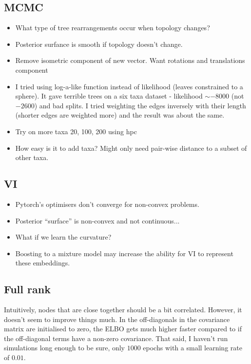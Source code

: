 \documentclass[11pt, twocolumn]{article}
\begin{document}
\subsection{MCMC}
\begin{itemize}
\item What type of tree rearrangements occur when topology changes?
\item Posterior surfance is smooth if topology doesn't change.
\item Remove isometric component of new vector. Want rotations and translations component
\item I tried using log-a-like function instead of likelihood \cite{wilson2021learning} (leaves constrained to a sphere). It gave terrible trees on a six taxa dataset - likelihood $\sim -8000$ (not $-2600$) and bad splits. I tried weighting the edges inversely with their length (shorter edges are weighted more) and the result was about the same.
\item Try on more taxa 20, 100, 200 using hpc
\item How easy is it to add taxa? Might only need pair-wise distance to a subset of other taxa.
\end{itemize}

\subsection{VI}
\begin{itemize}
\item Pytorch's optimisers don't converge for non-convex problems.
\item Posterior ``surface'' is non-convex and not continuous...
\item What if we learn the curvature?
\item Boosting to a mixture model may increase the ability for VI to represent these embeddings.
\end{itemize}

\subsection{Full rank}
Intuitively, nodes that are close together should be a bit correlated. However, it doesn't seem to improve things much. In the off-diagonals in the covariance matrix are initialised to zero, the ELBO gets much higher faster compared to if the off-diagonal terms have a non-zero covariance. That said, I haven't run simulations long enough to be sure, only $1000$ epochs with a small learning rate of $0.01$.
\end{document}
